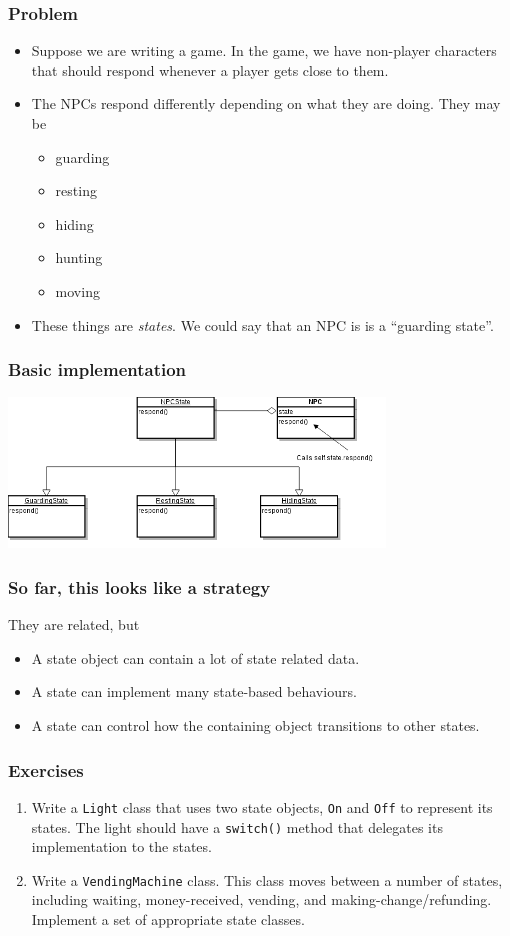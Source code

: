 \documentclass[10pt]{beamer}
\begin{document}
\begin{frame}
	\frametitle{Problem}
	\begin{itemize}
		\item Suppose we are writing a game.  In the game, we have
			non-player characters that should respond whenever a 
			player gets close to them.
		\item The NPCs respond differently depending on what they
			are doing.  They may be
			\begin{itemize}
				\item guarding
				\item resting
				\item hiding
		                \item hunting
				\item moving
			\end{itemize}
		\item These things are \emph{states}.  We could say that
			an NPC is is a ``guarding state''.
	\end{itemize}
\end{frame}
\begin{frame}
	\frametitle{Basic implementation}

	\includegraphics[width=100mm]{state-pattern.png}
\end{frame}
\begin{frame}
	\frametitle{So far, this looks like a strategy}

	They are related, but
	\begin{itemize}
		\item A state object can contain a lot
			of state related data.
		\item A state can implement many state-based
			behaviours.
		\item A state can control how the containing object
			transitions to other states.
	\end{itemize}
\end{frame}

\begin{frame}
	\frametitle{Exercises}

	\begin{enumerate}
		\item Write a \texttt{Light} class that uses two 
			state objects, \texttt{On} and \texttt{Off} to
			represent its states. The light should have a
			\texttt{switch()} method that delegates its
			implementation to the states.
		\item Write a \texttt{VendingMachine} class.  This class
			moves between a number of states, including 
			waiting, money-received, vending, and 
			making-change/refunding.  Implement a set
			of appropriate state classes.
	\end{enumerate}
\end{frame}
\end{document}
